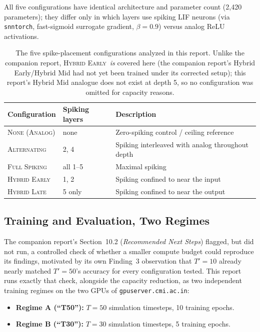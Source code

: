 \documentclass[11pt]{article}
\newcommand{\None}{\textsc{None (Analog)}}
\newcommand{\Alternating}{\textsc{Alternating}}
\newcommand{\FullSpiking}{\textsc{Full Spiking}}
\newcommand{\HybridLate}{\textsc{Hybrid Late}}
\newcommand{\HybridEarly}{\textsc{Hybrid Early}}
\begin{document}
All five configurations have identical architecture and parameter count (2{,}420 parameters); they
differ only in which layers use spiking LIF neurons (via \texttt{snntorch}, fast-sigmoid surrogate
gradient, $\beta=0.9$) versus analog ReLU activations.

\begin{table}[H]
\centering
\begin{tabular}{@{}lll@{}}
\toprule
\textbf{Configuration} & \textbf{Spiking layers} & \textbf{Description} \\
\midrule
\None & none & Zero-spiking control / ceiling reference \\
\Alternating & 2, 4 & Spiking interleaved with analog throughout depth \\
\FullSpiking & all 1--5 & Maximal spiking \\
\HybridEarly & 1, 2 & Spiking confined to near the input \\
\HybridLate & 5 only & Spiking confined to near the output \\
\bottomrule
\end{tabular}
\caption{The five spike-placement configurations analyzed in this report. Unlike the companion
report, \HybridEarly\ \emph{is} covered here (the companion report's Hybrid Early/Hybrid Mid had not
yet been trained under its corrected setup); this report's Hybrid Mid analogue does not exist at
depth 5, so no configuration was omitted for capacity reasons.}
\label{tab:configs}
\end{table}

\subsection{Training and Evaluation, Two Regimes}
\label{sec:regimes}

The companion report's Section~10.2 (\emph{Recommended Next Steps}) flagged, but did not run, a
controlled check of whether a smaller compute budget could reproduce its findings, motivated by its
own Finding~3 observation that $T'=10$ already nearly matched $T'=50$'s accuracy for every
configuration tested. This report runs exactly that check, alongside the capacity reduction, as two
independent training regimes on the two GPUs of \texttt{gpuserver.cmi.ac.in}:

\begin{itemize}[leftmargin=1.5em]
\item \textbf{Regime A (``T50''):} $T=50$ simulation timesteps, 10 training epochs.
\item \textbf{Regime B (``T30''):} $T=30$ simulation timesteps, 5 training epochs.
\end{itemize}
\end{document}
